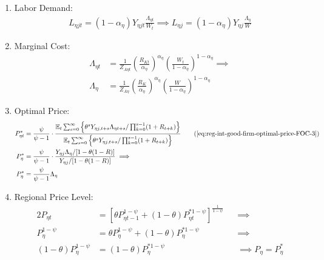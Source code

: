 \documentclass[
thesis.tex
]{subfiles}
\begin{document}
\begin{enumerate}
	\item Labor Demand:
	\begin{align}
		L_{\eta jt} = (1-{\alpha_\eta}) Y_{\eta jt} \frac{\Lambda_{\eta t}}{W_t} \implies L_{\eta j} = (1 -{\alpha_\eta}) Y_{\eta j} \frac{\Lambda_{\eta}}{W} \label{eq:reg-ss-int-good-firm-FOC-Lt}
	\end{align}

	\item Marginal Cost:
	\begin{align}
		\Lambda_{\eta t} &= \frac{1}{Z_{A\eta t}} \left( \frac{R_{Kt}}{{\alpha_\eta}} \right)^{{\alpha_\eta}} \left( \frac{W_t}{1-{\alpha_\eta}} \right)^{1-{\alpha_\eta}} \implies \nonumber \\
		\Lambda_{\eta} &= \frac{1}{Z_{A\eta}} \left( \frac{R_K}{{\alpha_\eta}} \right)^{{\alpha_\eta}} \left( \frac{W}{1-{\alpha_\eta}} \right)^{1-{\alpha_\eta}} \label{eq:reg-ss-int-good-firm-MC-2}
	\end{align}

	\item Optimal Price:
	\begin{alignat}{2}
		P_{\eta t}^\ast &= \frac{\psi}{\psi-1} \cdot \frac{\E \sum_{s=0}^{\infty} \left\{\theta^s Y_{\eta j,t+s} \Lambda_{\eta t+s} / \prod_{k=0}^{s-1}(1+R_{t+k}) \right\}} {\E \sum_{s=0}^{\infty} \left\{ \theta^s Y_{\eta j,t+s} / \prod_{k=0}^{s-1}(1+R_{t+k}) \right\}} \tag{\ref{eq:reg-int-good-firm-optimal-price-FOC-3}} \\
		P_{\eta}^\ast &= \frac{\psi}{\psi-1} \cdot \frac{ Y_{\eta j} \Lambda_{\eta} / [1-\theta(1-R)]} {Y_{\eta j} / [1-\theta(1-R)]} \implies \nonumber \\
		P_{\eta}^\ast &= \frac{\psi}{\psi-1} \Lambda_{\eta} \label{eq:reg-ss-int-good-firm-optimal-price-FOC-3}
	\end{alignat}

	\item Regional Price Level:
	\begin{alignat}{2}
		\label{eq:reg-ss-general-price-level}
		P_{\eta t} &= \left[ \theta P_{\eta t-1}^{1-\psi} + (1-\theta) P_{\eta t}^{\ast 1-\psi} \right]^\frac{1}{1-\psi} &&\implies \nonumber \\
		P_{\eta}^{1-\psi} &= \theta P_{\eta}^{1-\psi} + (1-\theta) P_{\eta}^{\ast 1-\psi} &&\implies \nonumber \\ 
		(1-\theta) P_{\eta}^{1-\psi} &= (1-\theta) P_{\eta}^{\ast 1-\psi} &&\implies P_{\eta} = P_{\eta}^\ast
	\end{alignat}


\end{enumerate}
\end{document}
